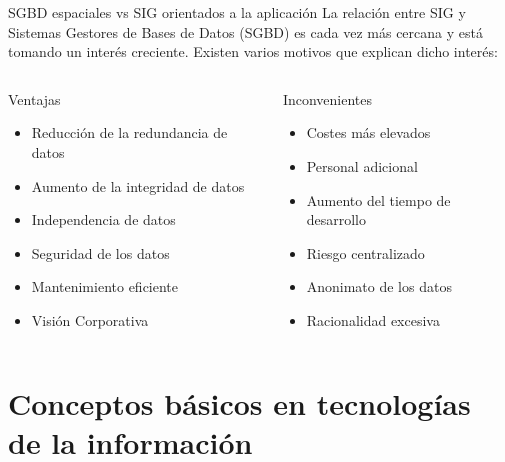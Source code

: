 \documentclass{classes/beamer_GeomaticaUA}
\begin{document}
\begin{frame}{SGBD espaciales vs SIG orientados a la aplicación}
La relación entre SIG y Sistemas Gestores de Bases de Datos (SGBD) es cada vez más cercana y está tomando un interés creciente. Existen varios motivos que explican dicho interés:

\begin{columns}
\begin{column}{0.5\textwidth}
\begin{exampleblock}{Ventajas}
\begin{itemize}
\item Reducción de la redundancia de datos
\item Aumento de la integridad de datos
\item Independencia de datos
\item Seguridad de los datos
\item Mantenimiento eficiente
\item Visión Corporativa
\end{itemize}
\end{exampleblock}
\end{column}

\begin{column}{0.5\textwidth}
\begin{alertblock}{Inconvenientes}
\begin{itemize}
\item Costes más elevados
\item Personal adicional
\item Aumento del tiempo de desarrollo
\item Riesgo centralizado
\item Anonimato de los datos
\item Racionalidad excesiva
\end{itemize}
\end{alertblock}
\end{column}
\end{columns}
\end{frame}


\section[Conceptos]{Conceptos básicos en tecnologías de la información}
\end{document}

